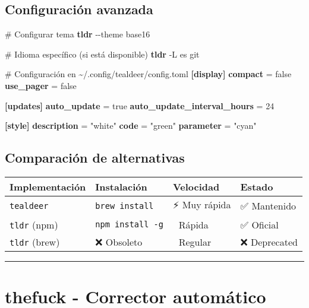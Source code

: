 \documentclass[
  11pt,
  letterpaper,
  oneside,
  openany]{scrbook}
\newenvironment{Shaded}{}{}
\newcommand{\AttributeTok}[1]{\textcolor[rgb]{0.84,0.23,0.29}{#1}}
\newcommand{\CommentTok}[1]{\textcolor[rgb]{0.42,0.45,0.49}{#1}}
\newcommand{\ExtensionTok}[1]{\textcolor[rgb]{0.84,0.23,0.29}{\textbf{#1}}}
\newcommand{\NormalTok}[1]{\textcolor[rgb]{0.14,0.16,0.18}{#1}}
\newcommand{\StringTok}[1]{\textcolor[rgb]{0.01,0.18,0.38}{#1}}
\begin{document}
\subsection{Configuración avanzada}\label{configuraciuxf3n-avanzada}

\begin{Shaded}
\begin{Highlighting}[]
\CommentTok{\# Configurar tema}
\ExtensionTok{tldr} \AttributeTok{{-}{-}theme}\NormalTok{ base16}

\CommentTok{\# Idioma específico (si está disponible)  }
\ExtensionTok{tldr} \AttributeTok{{-}L}\NormalTok{ es git}

\CommentTok{\# Configuración en \textasciitilde{}/.config/tealdeer/config.toml}
\ExtensionTok{[display]}
\ExtensionTok{compact}\NormalTok{ = false}
\ExtensionTok{use\_pager}\NormalTok{ = false}

\ExtensionTok{[updates]}
\ExtensionTok{auto\_update}\NormalTok{ = true}
\ExtensionTok{auto\_update\_interval\_hours}\NormalTok{ = 24}

\ExtensionTok{[style]}
\ExtensionTok{description}\NormalTok{ = }\StringTok{"white"}
\ExtensionTok{code}\NormalTok{ = }\StringTok{"green"}
\ExtensionTok{parameter}\NormalTok{ = }\StringTok{"cyan"}
\end{Highlighting}
\end{Shaded}

\subsection{Comparación de
alternativas}\label{comparaciuxf3n-de-alternativas}

\begin{longtable}[]{@{}llll@{}}
\toprule\noalign{}
Implementación & Instalación & Velocidad & Estado \\
\midrule\noalign{}
\endhead
\bottomrule\noalign{}
\endlastfoot
\texttt{tealdeer} & \texttt{brew\ install} & ⚡ Muy rápida & ✅
Mantenido \\
\texttt{tldr} (npm) & \texttt{npm\ install\ -g} & 🚀 Rápida & ✅
Oficial \\
\texttt{tldr} (brew) & ❌ Obsoleto & 🐌 Regular & ❌ Deprecated \\
\end{longtable}

\begin{center}\rule{0.5\linewidth}{0.5pt}\end{center}

\section{thefuck - Corrector automático}\label{sec-thefuck}
\end{document}
